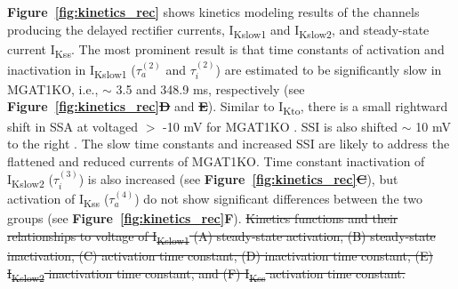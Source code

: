\documentclass[11pt]{article}
\providecommand{\DIFadd}[1]{{\protect\color{blue}\uwave{#1}}} %
\providecommand{\DIFdel}[1]{{\protect\color{red}\sout{#1}}}                      %
\providecommand{\DIFaddbegin}{} %
\providecommand{\DIFaddend}{} %
\providecommand{\DIFdelbegin}{} %
\providecommand{\DIFdelend}{} %
\providecommand{\DIFdelFL}[1]{\DIFdel{#1}} %
\newcommand{\DIFscaledelfig}{0.5}
\newlength{\DIFdelgraphicswidth} %
\newlength{\DIFdelgraphicsheight} %
\newcommand{\DIFaddincludegraphics}[2][]{{\color{blue}\fbox{\DIFOincludegraphics[#1]{#2}}}} %
\newcommand{\DIFdelincludegraphics}[2][]{%
\sbox{\DIFdelgraphicsbox}{\DIFOincludegraphics[#1]{#2}}%
\settoboxwidth{\DIFdelgraphicswidth}{\DIFdelgraphicsbox} %
\settoboxtotalheight{\DIFdelgraphicsheight}{\DIFdelgraphicsbox} %
\scalebox{\DIFscaledelfig}{%
\parbox[b]{\DIFdelgraphicswidth}{\usebox{\DIFdelgraphicsbox}\\[-\baselineskip] \rule{\DIFdelgraphicswidth}{0em}}\llap{\resizebox{\DIFdelgraphicswidth}{\DIFdelgraphicsheight}{%
\setlength{\unitlength}{\DIFdelgraphicswidth}%
\begin{picture}(1,1)%
\thicklines\linethickness{2pt} %
{\color[rgb]{1,0,0}\put(0,0){\framebox(1,1){}}}%
{\color[rgb]{1,0,0}\put(0,0){\line( 1,1){1}}}%
{\color[rgb]{1,0,0}\put(0,1){\line(1,-1){1}}}%
\end{picture}%
}\hspace*{3pt}}} %
} %
\DeclareRobustCommand{\DIFaddbegin}{\DIFOaddbegin \let\includegraphics\DIFaddincludegraphics} %
\DeclareRobustCommand{\DIFaddend}{\DIFOaddend \let\includegraphics\DIFOincludegraphics} %
\DeclareRobustCommand{\DIFdelbegin}{\DIFOdelbegin \let\includegraphics\DIFdelincludegraphics} %
\DeclareRobustCommand{\DIFdelend}{\DIFOaddend \let\includegraphics\DIFOincludegraphics} %
\begin{document}
\textbf{Figure~\ref{fig:kinetics_rec}} shows kinetics modeling results of the channels producing the delayed rectifier currents, I\textsubscript{Kslow1} and I\textsubscript{Kslow2}, and steady-state current I\textsubscript{Kss}. The most prominent result is that time constants of activation and inactivation in I\textsubscript{Kslow1} ($\tau_{a}^{(2)}$ and $\tau_{i}^{(2)}$) are estimated to be significantly slow in MGAT1KO, i.e., $\sim$ 3.5 and 348.9 ms, respectively (see \textbf{Figure~\ref{fig:kinetics_rec}\DIFdelbegin \DIFdel{D}\DIFdelend \DIFaddbegin \DIFadd{C}\DIFaddend } and \textbf{\DIFdelbegin \DIFdel{E}\DIFdelend \DIFaddbegin \DIFadd{D}\DIFaddend }). Similar to I\textsubscript{Kto}, there is a small rightward shift in SSA at voltaged $>$ -10 mV for MGAT1KO \DIFaddbegin \DIFadd{(see }\textbf{\DIFadd{Figure~\ref{fig:kinetics_rec}A}}\DIFadd{)}\DIFaddend . SSI is also shifted $\sim$ 10 mV to the right \DIFaddbegin \DIFadd{(see }\textbf{\DIFadd{Figure~\ref{fig:kinetics_rec}B}}\DIFadd{)}\DIFaddend . The slow time constants and increased SSI are likely to address the flattened and reduced currents of MGAT1KO. Time constant inactivation of I\textsubscript{Kslow2} ($\tau_{i}^{(3)}$) is also increased (see \textbf{Figure~\ref{fig:kinetics_rec}\DIFdelbegin \DIFdel{C}\DIFdelend \DIFaddbegin \DIFadd{E}\DIFaddend }), but activation of I\textsubscript{Kss} ($\tau_{a}^{(4)}$) do not show significant differences between the two groups (see \textbf{Figure~\ref{fig:kinetics_rec}F}). \DIFdelbegin %
{%
\DIFdelFL{Kinetics functions and their relationships to voltage of I\textsubscript{Kslow1} (A) steady-state activation, (B) steady-state inactivation, (C) activation time constant, (D) inactivation time constant, (E) I\textsubscript{Kslow2} inactivation time constant, and (F) I\textsubscript{Kss} activation time constant.}}

\end{document}
